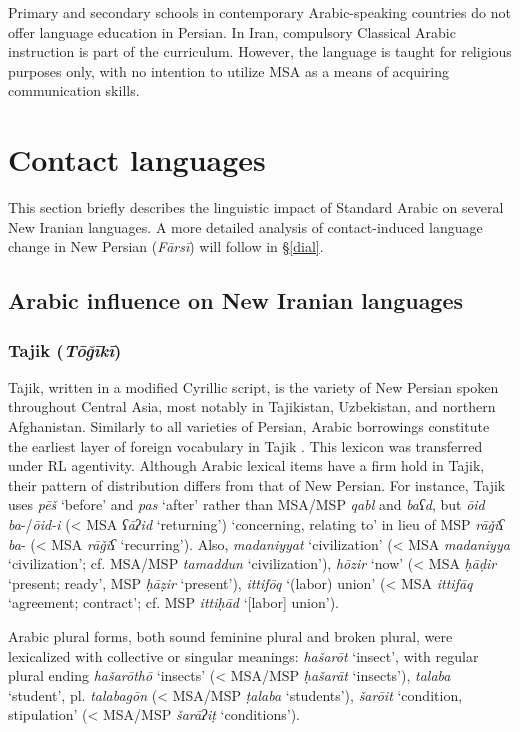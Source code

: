 \documentclass[output=paper]{langsci/langscibook}
\begin{document}
Primary and secondary schools in contemporary Arabic-speaking countries do not offer language education in Persian. In Iran, compulsory Classical Arabic instruction is part of the curriculum. However, the language is taught for religious purposes only, with no intention to utilize MSA as a means of acquiring communication skills.

\section{Contact languages}

This section briefly describes the linguistic impact of Standard Arabic on several New Iranian languages. A more detailed analysis of contact-induced language change in New Persian (\textit{Fārsī}) will follow in §\ref{dial}.

\subsection{Arabic influence on New Iranian languages}

\subsubsection{Tajik (\textit{Tōǧīkī})}

Tajik, written in a modified Cyrillic script, is the variety of New Persian spoken throughout Central Asia, most notably in Tajikistan, Uzbekistan, and northern Afghanistan. Similarly to all varieties of Persian, Arabic borrowings constitute the earliest layer of foreign vocabulary in Tajik \citep{Perry2009}. This lexicon was transferred under RL agentivity. Although Arabic lexical items have a firm hold in Tajik, their pattern of distribution differs from that of New Persian. For instance, Tajik uses \textit{pēš} ‘before’ and \textit{pas} ‘after’ rather than MSA/MSP \textit{qabl} and \textit{baʕd}, but \textit{ōid} \textit{ba}{}-/\textit{ōid-i} (< MSA \textit{ʕāʔid} ‘returning’) ‘concerning, relating to’ in lieu of MSP \textit{rāǧiʕ} \textit{ba}{}- (< MSA \textit{rāǧiʕ} ‘recurring’). Also, \textit{madaniyyat} ‘civilization’ (< MSA \textit{madaniyya} ‘civilization’; cf. MSA/MSP \textit{tamaddun} ‘civilization’), \textit{hōzir} ‘now’ (< MSA \textit{ḥāḍir} ‘present; ready’, MSP \textit{ḥāẓir} ‘present’), \textit{ittifōq} ‘(labor) union’ (< MSA \textit{ittifāq} ‘agreement; contract’; cf.  MSP \textit{ittiḥād} ‘[labor] union’).

Arabic plural forms, both sound feminine plural and broken plural, were lexicalized with collective or singular meanings: \textit{hašarōt} ‘insect’, with regular plural ending \textit{hašarōthō} ‘insects’ (< MSA/MSP \textit{ḥašarāt} ‘insects’), \textit{talaba} ‘student’, pl. \textit{talabagōn} (< MSA/MSP \textit{ṭalaba} ‘students’), \textit{šarōit} ‘condition, stipulation’ (< MSA/MSP \textit{šarāʔiṭ} ‘conditions’).
\end{document}
